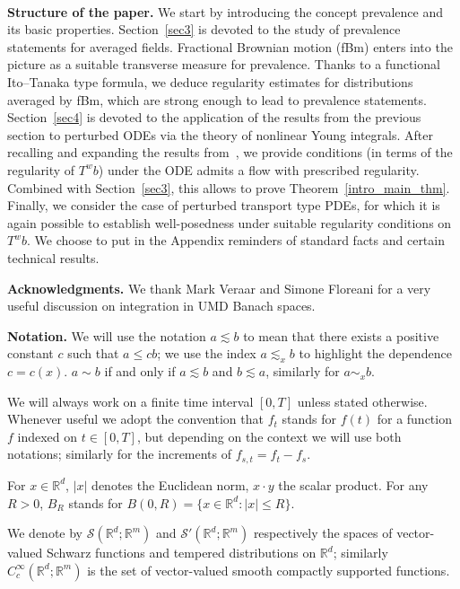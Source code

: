 \documentclass[10pt]{article}
\newcommand{\tmstrong}[1]{\textbf{#1}}
\newcommand{\tmtextbf}[1]{{\bfseries{#1}}}
\begin{document}
\

\tmtextbf{Structure of the paper.} We start by introducing the concept
prevalence and its basic properties. Section~\ref{sec3} is devoted to the
study of prevalence statements for averaged fields. Fractional Brownian motion
(fBm) enters into the picture as a suitable transverse measure for prevalence.
Thanks to a functional Ito--Tanaka type formula, we deduce regularity
estimates for distributions averaged by fBm, which are strong enough to lead
to prevalence statements. Section~\ref{sec4} is devoted to the application of
the results from the previous section to perturbed ODEs via the theory of
nonlinear Young integrals. After recalling and expanding the results
from~{\cite{catelliergubinelli}}, we provide conditions (in terms of the
regularity of $T^w b$) under the ODE admits a flow with prescribed regularity.
Combined with Section~\ref{sec3}, this allows to prove
Theorem~\ref{intro_main_thm}. Finally, we consider the case of perturbed
transport type PDEs, for which it is again possible to establish
well-posedness under suitable regularity conditions on $T^w b$. We choose to
put in the Appendix reminders of standard facts and certain technical results.


\tmtextbf{Acknowledgments.} We thank Mark Veraar and Simone Floreani for a
very useful discussion on integration in UMD Banach spaces.
\

{\tmstrong{Notation.}} We will use the notation $a \lesssim b$ to mean that
there exists a positive constant $c$ such that $a \leqslant c b$; we use the
index $a \lesssim_x b$ to highlight the dependence $c = c (x)$. $a \sim b$ if
and only if $a \lesssim b$ and $b \lesssim a$, similarly for $a \sim_x b$.

We will always work on a finite time interval $[0, T]$ unless stated
otherwise. Whenever useful we adopt the convention that $f_t$ stands for $f
(t)$ for a function $f$ indexed on $t \in [0, T]$, but depending on the
context we will use both notations; similarly for the increments of $f_{s, t}
= f_t - f_s$.

For $x \in \mathbb{R}^d$, $| x |$ denotes the Euclidean norm, $x \cdot y$ the
scalar product. For any $R > 0$, $B_R$ stands for $B (0, R) = \{ x \in
\mathbb{R}^d : | x | \leqslant R \}$.

We denote by $\mathcal{S} (\mathbb{R}^d ; \mathbb{R}^m)$ and $\mathcal{S}'
(\mathbb{R}^d ; \mathbb{R}^m)$ respectively the spaces of vector\mbox{-}valued
Schwarz functions and tempered distributions on $\mathbb{R}^d$; similarly
$C^{\infty}_c (\mathbb{R}^d ; \mathbb{R}^m)$ is the set of
vector\mbox{-}valued smooth compactly supported functions.
\end{document}
